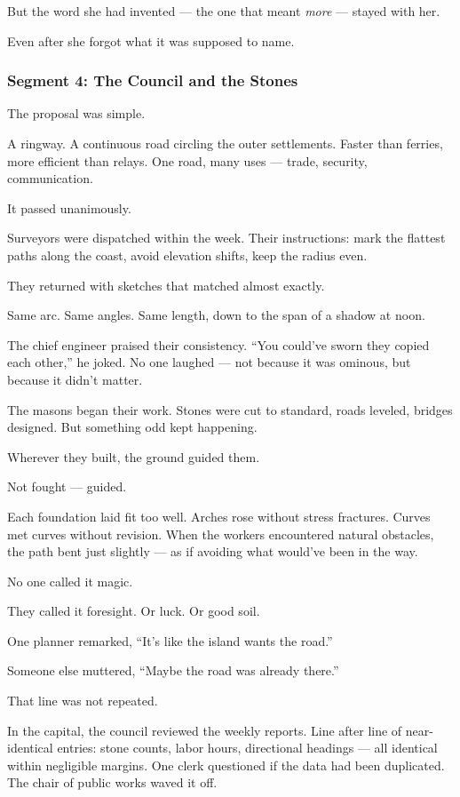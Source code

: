 \documentclass[9pt]{article}
\begin{document}
But the word she had invented — the one that meant \emph{more} — stayed with her.

Even after she forgot what it was supposed to name.


\newpage

\subsubsection*{Segment 4: The Council and the Stones}

The proposal was simple.

A ringway. A continuous road circling the outer settlements. Faster than ferries, more efficient than relays. One road, many uses — trade, security, communication.

It passed unanimously.

Surveyors were dispatched within the week. Their instructions: mark the flattest paths along the coast, avoid elevation shifts, keep the radius even.

They returned with sketches that matched almost exactly.

Same arc. Same angles. Same length, down to the span of a shadow at noon.

The chief engineer praised their consistency. ``You could’ve sworn they copied each other,'' he joked. No one laughed — not because it was ominous, but because it didn’t matter.

The masons began their work. Stones were cut to standard, roads leveled, bridges designed. But something odd kept happening.

Wherever they built, the ground guided them.

Not fought — guided.

Each foundation laid fit too well. Arches rose without stress fractures. Curves met curves without revision. When the workers encountered natural obstacles, the path bent just slightly — as if avoiding what would’ve been in the way.

No one called it magic.

They called it foresight. Or luck. Or good soil.

One planner remarked, ``It’s like the island wants the road.''

Someone else muttered, ``Maybe the road was already there.''

That line was not repeated.

In the capital, the council reviewed the weekly reports. Line after line of near-identical entries: stone counts, labor hours, directional headings — all identical within negligible margins. One clerk questioned if the data had been duplicated. The chair of public works waved it off.
\end{document}
